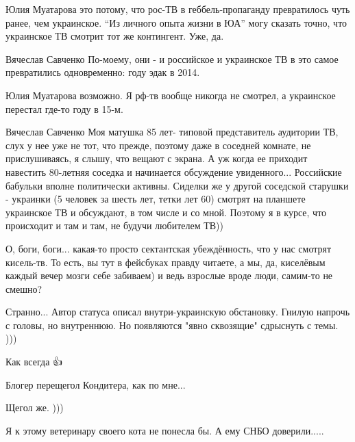 \begin{itemize}

Юлия Муатарова это потому, что рос-ТВ в геббель-пропаганду превратилось чуть
ранее, чем украинское.  \enquote{Из личного опыта жизни в ЮА} могу сказать
точно, что украинское ТВ смотрит тот же контингент. Уже, да.


Вячеслав Савченко По-моему, они - и российское и украинское ТВ в это самое
превратились одновременно: году эдак в 2014.


Юлия Муатарова возможно. Я рф-тв вообще никогда не смотрел, а украинское
перестал где-то году в 15-м.


Вячеслав Савченко Моя матушка 85 лет- типовой представитель аудитории ТВ, слух
у нее уже не тот, что прежде, поэтому даже в соседней комнате, не
прислушиваясь, я слышу, что вещают с экрана. А уж когда ее приходит навестить
80-летняя соседка и начинается обсуждение увиденного... Российские бабульки
вполне политически активны. Сиделки же у другой соседской старушки - украинки
(5 человек за шесть лет, тетки лет 60) смотрят на планшете украинское ТВ и
обсуждают, в том числе и со мной. Поэтому я в курсе, что происходит и там и
там, не будучи любителем ТВ))


О, боги, боги... какая-то просто сектантская убеждённость, что у нас смотрят
кисель-тв. То есть, вы тут в фейсбуках правду читаете, а мы, да, киселёвым
каждый вечер мозги себе забиваем) и ведь взрослые вроде люди, самим-то не
смешно?


Странно... Автор статуса описал внутри-украинскую обстановку. Гнилую напрочь с головы, но внутреннюю. Но появляются "явно сквозящие" сдрыснуть с темы. )))

Как всегда 👍


Блогер перещегол Кондитера, как по мне...


Щегол же. )))


Я к этому ветеринару своего кота не понесла бы. А ему СНБО доверили.....



\end{itemize}

